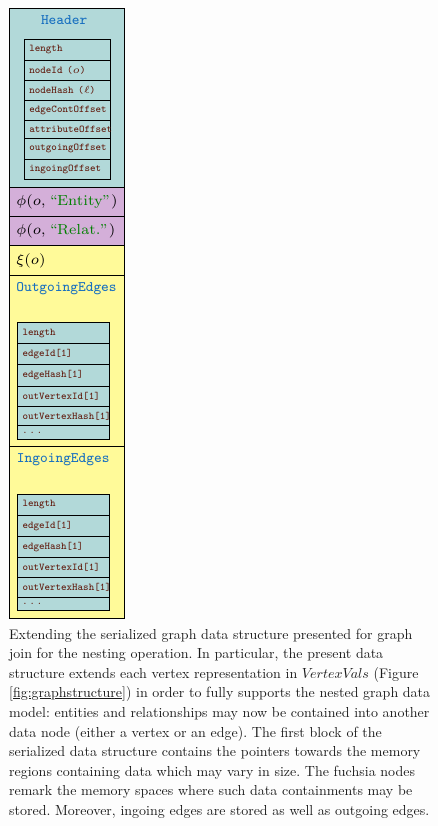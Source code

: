 \begin{figure}
\centering
\includegraphics[height=.8\textheight]{fig/06nesting/test}
\caption{Extending the serialized graph data structure presented for graph join for the nesting operation. In particular, the present data structure extends each vertex representation in $VertexVals$ (Figure \vref{fig:graphstructure}) in order to fully supports the nested graph data model:
entities and relationships may now be contained into another data node (either a vertex or an edge). The first block of the serialized data structure contains the pointers towards the memory regions containing data which may vary in size. The fuchsia nodes remark the memory spaces where such data containments may be stored. Moreover, ingoing edges are stored as well as outgoing edges. }\label{nestedGraphVertex}
\end{figure}
